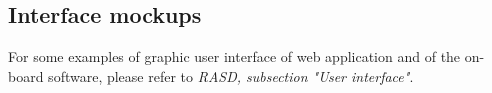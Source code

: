 \subsection{Interface mockups}

For some examples of graphic user interface of web application and of the on-board software, please refer to \textit{RASD, subsection "User interface"}.
